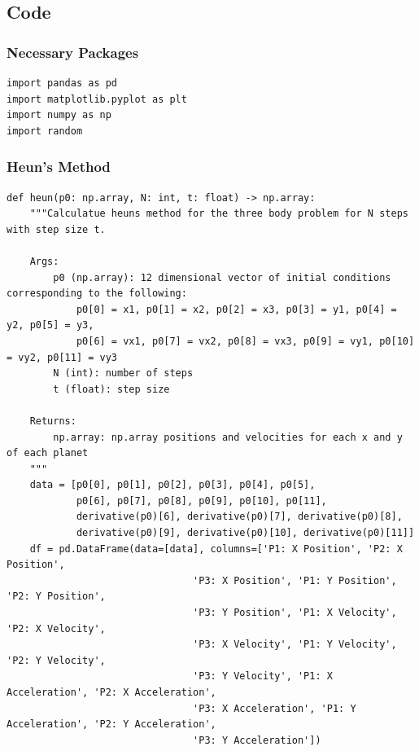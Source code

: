 \documentclass{article}
\begin{document}
\subsection{Code}
\subsubsection{Necessary Packages}
\begin{verbatim}
import pandas as pd
import matplotlib.pyplot as plt
import numpy as np
import random
\end{verbatim}

\subsubsection{Heun's Method}
\begin{verbatim}
def heun(p0: np.array, N: int, t: float) -> np.array:
    """Calculatue heuns method for the three body problem for N steps with step size t.

    Args:
        p0 (np.array): 12 dimensional vector of initial conditions corresponding to the following:
            p0[0] = x1, p0[1] = x2, p0[2] = x3, p0[3] = y1, p0[4] = y2, p0[5] = y3, 
            p0[6] = vx1, p0[7] = vx2, p0[8] = vx3, p0[9] = vy1, p0[10] = vy2, p0[11] = vy3
        N (int): number of steps
        t (float): step size

    Returns:
        np.array: np.array positions and velocities for each x and y of each planet
    """
    data = [p0[0], p0[1], p0[2], p0[3], p0[4], p0[5], 
            p0[6], p0[7], p0[8], p0[9], p0[10], p0[11], 
            derivative(p0)[6], derivative(p0)[7], derivative(p0)[8], 
            derivative(p0)[9], derivative(p0)[10], derivative(p0)[11]]
    df = pd.DataFrame(data=[data], columns=['P1: X Position', 'P2: X Position', 
                                'P3: X Position', 'P1: Y Position', 'P2: Y Position', 
                                'P3: Y Position', 'P1: X Velocity', 'P2: X Velocity', 
                                'P3: X Velocity', 'P1: Y Velocity', 'P2: Y Velocity', 
                                'P3: Y Velocity', 'P1: X Acceleration', 'P2: X Acceleration', 
                                'P3: X Acceleration', 'P1: Y Acceleration', 'P2: Y Acceleration', 
                                'P3: Y Acceleration'])


\end{verbatim}
\end{document}
